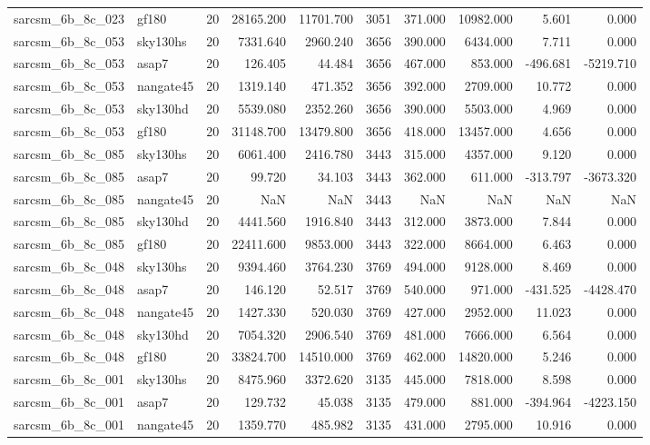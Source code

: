 \begin{tabular}{llrrrrrrrr}
sarcsm\_6b\_8c\_023 & gf180 & 20 & 28165.200 & 11701.700 & 3051 & 371.000 & 10982.000 & 5.601 & 0.000 \\
sarcsm\_6b\_8c\_053 & sky130hs & 20 & 7331.640 & 2960.240 & 3656 & 390.000 & 6434.000 & 7.711 & 0.000 \\
sarcsm\_6b\_8c\_053 & asap7 & 20 & 126.405 & 44.484 & 3656 & 467.000 & 853.000 & -496.681 & -5219.710 \\
sarcsm\_6b\_8c\_053 & nangate45 & 20 & 1319.140 & 471.352 & 3656 & 392.000 & 2709.000 & 10.772 & 0.000 \\
sarcsm\_6b\_8c\_053 & sky130hd & 20 & 5539.080 & 2352.260 & 3656 & 390.000 & 5503.000 & 4.969 & 0.000 \\
sarcsm\_6b\_8c\_053 & gf180 & 20 & 31148.700 & 13479.800 & 3656 & 418.000 & 13457.000 & 4.656 & 0.000 \\
sarcsm\_6b\_8c\_085 & sky130hs & 20 & 6061.400 & 2416.780 & 3443 & 315.000 & 4357.000 & 9.120 & 0.000 \\
sarcsm\_6b\_8c\_085 & asap7 & 20 & 99.720 & 34.103 & 3443 & 362.000 & 611.000 & -313.797 & -3673.320 \\
sarcsm\_6b\_8c\_085 & nangate45 & 20 & NaN & NaN & 3443 & NaN & NaN & NaN & NaN \\
sarcsm\_6b\_8c\_085 & sky130hd & 20 & 4441.560 & 1916.840 & 3443 & 312.000 & 3873.000 & 7.844 & 0.000 \\
sarcsm\_6b\_8c\_085 & gf180 & 20 & 22411.600 & 9853.000 & 3443 & 322.000 & 8664.000 & 6.463 & 0.000 \\
sarcsm\_6b\_8c\_048 & sky130hs & 20 & 9394.460 & 3764.230 & 3769 & 494.000 & 9128.000 & 8.469 & 0.000 \\
sarcsm\_6b\_8c\_048 & asap7 & 20 & 146.120 & 52.517 & 3769 & 540.000 & 971.000 & -431.525 & -4428.470 \\
sarcsm\_6b\_8c\_048 & nangate45 & 20 & 1427.330 & 520.030 & 3769 & 427.000 & 2952.000 & 11.023 & 0.000 \\
sarcsm\_6b\_8c\_048 & sky130hd & 20 & 7054.320 & 2906.540 & 3769 & 481.000 & 7666.000 & 6.564 & 0.000 \\
sarcsm\_6b\_8c\_048 & gf180 & 20 & 33824.700 & 14510.000 & 3769 & 462.000 & 14820.000 & 5.246 & 0.000 \\
sarcsm\_6b\_8c\_001 & sky130hs & 20 & 8475.960 & 3372.620 & 3135 & 445.000 & 7818.000 & 8.598 & 0.000 \\
sarcsm\_6b\_8c\_001 & asap7 & 20 & 129.732 & 45.038 & 3135 & 479.000 & 881.000 & -394.964 & -4223.150 \\
sarcsm\_6b\_8c\_001 & nangate45 & 20 & 1359.770 & 485.982 & 3135 & 431.000 & 2795.000 & 10.916 & 0.000 \\

\end{tabular}
